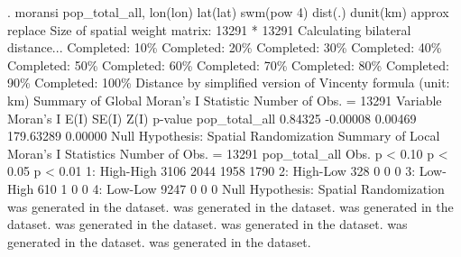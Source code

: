 . moransi pop_total_all, lon(lon) lat(lat) swm(pow 4) dist(.) dunit(km) approx replace
{\smallskip}
Size of spatial weight matrix: 13291 * 13291
Calculating bilateral distance...
{\TOPT}
{\VBAR}Completed:  10\%{\VBAR}
{\VBAR}Completed:  20\%{\VBAR}
{\VBAR}Completed:  30\%{\VBAR}
{\VBAR}Completed:  40\%{\VBAR}
{\VBAR}Completed:  50\%{\VBAR}
{\VBAR}Completed:  60\%{\VBAR}
{\VBAR}Completed:  70\%{\VBAR}
{\VBAR}Completed:  80\%{\VBAR}
{\VBAR}Completed:  90\%{\VBAR}
{\VBAR}Completed: 100\%{\VBAR}
{\BOTT}
{\smallskip}
Distance by simplified version of Vincenty formula (unit: km)
{\smallskip}
Summary of Global Moran's I Statistic                      Number of Obs. =     13291
            Variable {\VBAR}  Moran's I         E(I)        SE(I)         Z(I)      p-value
       pop_total_all {\VBAR}    0.84325     -0.00008      0.00469    179.63289      0.00000
Null Hypothesis: Spatial Randomization
{\smallskip}
{\smallskip}
Summary of Local Moran's I Statistics                      Number of Obs. =     13291
       pop_total_all {\VBAR}           Obs.        p < 0.10        p < 0.05        p < 0.01
        1: High-High {\VBAR}           3106            2044            1958            1790
        2: High-Low  {\VBAR}            328               0               0               0
        3: Low-High  {\VBAR}            610               1               0               0
        4: Low-Low   {\VBAR}           9247               0               0               0
Null Hypothesis: Spatial Randomization
{\smallskip}
{} was generated in the dataset.
{} was generated in the dataset.
{} was generated in the dataset.
{} was generated in the dataset.
{} was generated in the dataset.
{} was generated in the dataset.
{} was generated in the dataset.
